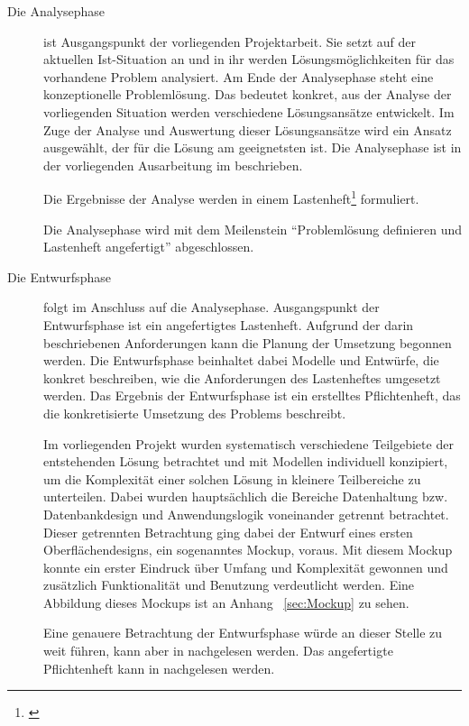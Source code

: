 \begin{description}

  \item[Die Analysephase] ist Ausgangspunkt der vorliegenden Projektarbeit. Sie setzt
  auf der aktuellen Ist-Situation an und in ihr werden Lösungsmöglichkeiten für
  das vorhandene Problem analysiert. Am Ende der Analysephase steht eine
  konzeptionelle Problemlösung. Das bedeutet konkret, aus der Analyse der
  vorliegenden Situation werden verschiedene Lösungsansätze entwickelt. Im
  Zuge der Analyse und Auswertung dieser Lösungsansätze wird ein Ansatz
  ausgewählt, der für die Lösung am geeignetsten ist. Die Analysephase ist in
  der vorliegenden Ausarbeitung im  beschrieben.

  Die Ergebnisse der Analyse werden in einem Lastenheft\footnote{\citet{lastenheft2013}} formuliert.

  Die Analysephase wird mit dem Meilenstein "`Problemlösung definieren und
  Lastenheft angefertigt"' abgeschlossen.

  \item[Die Entwurfsphase] folgt im Anschluss auf die Analysephase.
  Ausgangspunkt der Entwurfsphase ist ein angefertigtes Lastenheft. Aufgrund der
  darin beschriebenen Anforderungen kann die Planung der Umsetzung
  begonnen werden. Die
  Entwurfsphase beinhaltet dabei Modelle und Entwürfe, 
  die konkret beschreiben, wie die
  Anforderungen des Lastenheftes umgesetzt werden. Das Ergebnis der Entwurfsphase ist ein erstelltes Pflichtenheft, das die konkretisierte Umsetzung des Problems
  beschreibt.

  Im vorliegenden Projekt wurden systematisch verschiedene Teilgebiete der
  entstehenden Lösung betrachtet und mit Modellen individuell konzipiert, um die
  Komplexität einer solchen Lösung in kleinere Teilbereiche zu unterteilen. Dabei
  wurden hauptsächlich die Bereiche Datenhaltung bzw. Datenbankdesign und
  Anwendungslogik voneinander getrennt betrachtet. Dieser getrennten Betrachtung
  ging dabei der Entwurf eines ersten Oberflächendesigns, ein sogenanntes
  Mockup, voraus. Mit diesem Mockup konnte ein erster Eindruck über Umfang und
  Komplexität gewonnen und zusätzlich Funktionalität und Benutzung
  verdeutlicht werden. Eine Abbildung dieses Mockups ist an Anhang ~\ref{sec:Mockup} zu sehen.

  Eine genauere Betrachtung der Entwurfsphase würde an dieser Stelle zu weit führen,
  kann aber in \citet{modelierungUndBetrieb2014} nachgelesen werden.
  Das angefertigte Pflichtenheft kann in \citet{pflichtenheft2013} nachgelesen werden.


\end{description}
